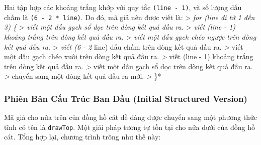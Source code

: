 Hai tập hợp các khoảng trắng khớp với quy tắc \texttt{(line\ -\ 1)}, và
số lượng dấu chấm là \texttt{(6\ -\ 2\ *\ line)}. Do đó, mã giả nên được
viết là: \textgreater{} \emph{for (line đi từ 1 đến 3) \{}
\textgreater{} \emph{viết một dấu gạch sổ dọc trên dòng kết quả đầu ra.}
\textgreater{} \emph{viết (line - 1) khoảng trắng trên dòng kết quả đầu
ra.} \textgreater{} \emph{viết một dấu gạch chéo ngược trên dòng kết quả
đầu ra.} \textgreater{} \emph{viết (6 - 2 } line) dấu chấm trên dòng kết
quả đầu ra.\emph{ \textgreater{} }viết một dấu gạch chéo xuôi trên dòng
kết quả đầu ra.\emph{ \textgreater{} }viết (line - 1) khoảng trắng trên
dòng kết quả đầu ra.\emph{ \textgreater{} }viết một dấu gạch sổ dọc trên
dòng kết quả đầu ra.\emph{ \textgreater{} }chuyển sang một dòng kết quả
đầu ra mới.\emph{ \textgreater{} }\}*

\subsubsection{Phiên Bản Cấu Trúc Ban Đầu (Initial Structured
Version)}\label{phiuxean-bux1ea3n-cux1ea5u-truxfac-ban-ux111ux1ea7u-initial-structured-version}

Mã giả cho nửa trên của đồng hồ cát dễ dàng được chuyển sang một phương
thức tĩnh có tên là \texttt{drawTop}. Một giải pháp tương tự tồn tại cho
nửa dưới của đồng hồ cát. Tổng hợp lại, chương trình trông như thế này:

